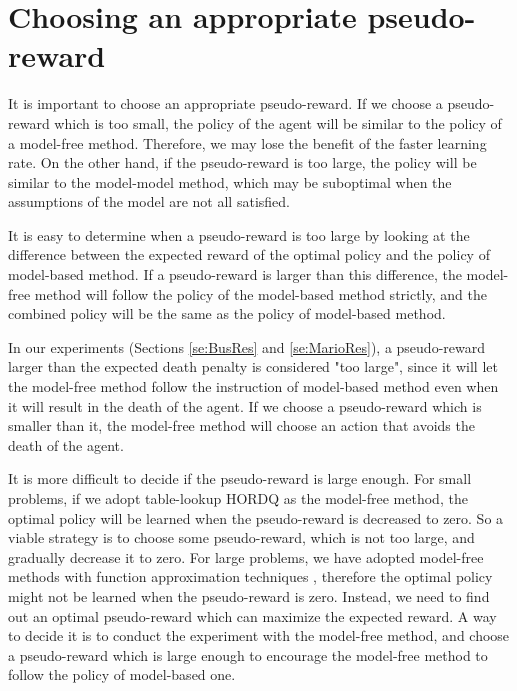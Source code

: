 
\section{Choosing an appropriate pseudo-reward}
It is important to choose an appropriate pseudo-reward. If we choose a pseudo-reward which is too small, 
the policy of the agent will be similar to the policy of a model-free method. Therefore, we may lose the 
benefit of the faster learning rate. On the other hand, if the pseudo-reward is too large, 
the policy will be similar to the model-model method, which may be suboptimal
when the assumptions of the model are not all satisfied.

It is easy to determine when a pseudo-reward is too large by
looking at the difference between the expected reward of the optimal policy and the policy of model-based method.
If a pseudo-reward is larger than this difference, the model-free method will follow the policy
of the model-based method strictly, and the combined policy will be the same as 
the policy of model-based method.

In our experiments (Sections \ref{se:BusRes} and \ref{se:MarioRes}), a pseudo-reward larger than the expected death penalty is considered "too large", 
since it will let the model-free method follow the instruction of model-based method even 
when it will result in the death of the agent. If we choose a pseudo-reward which is smaller than it,
the model-free method will choose an action that avoids the death of the agent.

It is more difficult to decide if the pseudo-reward is large enough. 
For small problems, if we adopt table-lookup HORDQ as the model-free method,
the optimal policy will be learned when the pseudo-reward is decreased to zero.
So a viable strategy is to choose some pseudo-reward, which is not too large, and
gradually decrease it to zero.
For large problems, we have adopted model-free methods with function approximation techniques
, therefore the optimal policy might not be learned when the pseudo-reward is zero.
Instead, we need to find out an optimal pseudo-reward which can maximize the expected reward.
A way to decide it is to conduct the experiment with the model-free method,
and choose a pseudo-reward which is large enough to encourage
the model-free method to follow the policy of model-based one.

